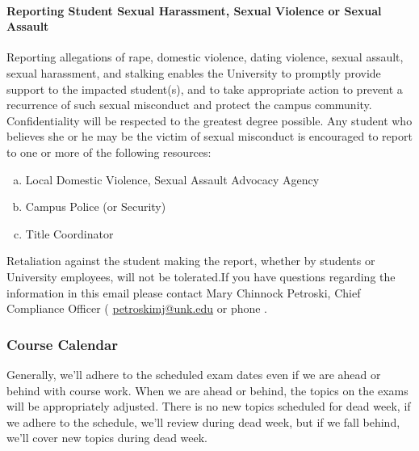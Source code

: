 \documentclass[12pt]{article}
\newcounter{ex}\setcounter{ex}{0}
\newenvironment{alphalist}{
  \begin{enumerate}[(a)]
    \addtolength{\itemsep}{-0.5\itemsep}}
  {\end{enumerate}}
\newcommand{\RomanNumeralCaps}[1]
      {\MakeUppercase{\romannumeral #1}}
\begin{document}
\paragraph{Reporting Student Sexual Harassment, Sexual Violence or Sexual Assault} Reporting allegations of rape, domestic violence, dating violence, sexual assault, sexual harassment, and stalking enables the University to promptly provide support to the impacted student(s), and to take appropriate action to prevent a recurrence of such sexual misconduct and protect the campus community. Confidentiality will be respected to the greatest degree possible. Any student who believes she or he may be the victim of sexual misconduct is encouraged to report to one or more of the following resources:
\begin{alphalist}
\item Local Domestic Violence, Sexual Assault Advocacy Agency 

\item Campus Police (or Security) 

\item Title \RomanNumeralCaps{9} Coordinator 

\end{alphalist}
Retaliation against the student making the report, whether by students or University employees, will not be tolerated.If you have questions regarding the information in this email please 
contact Mary Chinnock Petroski, Chief Compliance Officer (
   \href{mailto:petroskimj@unk.edu}{petroskimj@unk.edu} 
    or phone .



\subsubsection*{Course Calendar}

Generally, we'll adhere to the scheduled exam dates even if we are ahead or behind with course work.  When we are ahead or behind, the
topics on the exams will be appropriately adjusted.  There is no new topics scheduled for dead week, if we adhere to the schedule, we'll review during dead week, but
if we fall behind, we'll cover new topics during dead week.

\vspace{0.1in}
\end{document}
